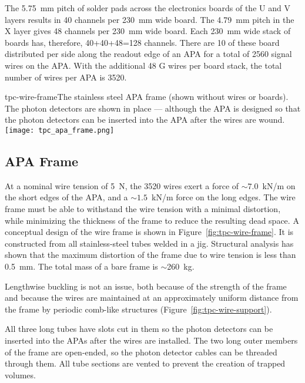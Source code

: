 The 5.75~mm pitch of solder pads across the electronics boards of the U and V layers results in 40 channels per 230~mm wide board.  The 4.79~mm pitch in the X layer gives 48 channels per 230~mm wide board.  Each 230~mm wide stack of boards has, therefore, 40+40+48=128 channels.  There are 10 of these board distributed per side along the readout edge of an APA for a total of 2560 signal wires on the APA.  With the additional 48 G wires per board stack, the total number of wires per APA is 3520.

\begin{cdrfigure}{tpc-wire-frame}{The stainless steel APA frame (shown without wires or boards). The photon detectors are shown in place --- although the APA is designed so that the photon detectors can be inserted into the APA after the wires are wound.}
\texttt{[image: tpc\_apa\_frame.png]}
\end{cdrfigure}


\subsection{APA Frame}

At a nominal wire tension of 5~N, the 3520 wires exert a force of 
$\sim 7.0$~kN/m on the short edges of the APA, and a 
$\sim 1.5 $~kN/m force on the long edges. The wire 
frame must be able to withstand the wire tension with a minimal 
distortion, while minimizing the thickness of the 
frame to reduce the resulting dead space. A conceptual design 
of the wire frame is shown in Figure~\ref{fig:tpc-wire-frame}.  
It is constructed from all stainless-steel tubes welded in a jig.  
Structural analysis has shown that the maximum distortion of the frame due to wire tension is less than 0.5~mm. The total mass of a bare frame is $\sim$260~kg.

Lengthwise buckling is not an issue, both because of the strength of the frame and because the wires are maintained at an approximately uniform distance from the frame by periodic comb-like structures (Figure~\ref{fig:tpc-wire-support}).

All three long tubes have slots cut in them so the photon detectors can be inserted into the APAs after the wires are installed.  The two long outer members of the frame are open-ended, so the photon detector cables can be threaded through them.  All tube sections are vented to prevent the creation of trapped volumes.



